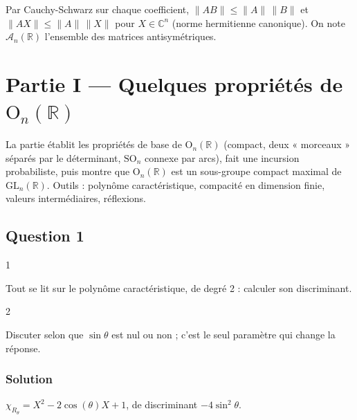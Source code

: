 \documentclass[11pt,a4paper]{article}
\begin{document}
Par Cauchy-Schwarz sur chaque coefficient, \(\|AB\|\le\|A\|\,\|B\|\) et \(\|AX\|\le\|A\|\,\|X\|\) pour \(X\in{\mathbb{C}}^n\) (norme hermitienne canonique). On note \({\mathcal{A}}_n(\mathbb{R})\) l'ensemble des matrices antisymétriques.

\hypertarget{partie-i-quelques-propriuxe9tuxe9s-de-mathrmo_nmathbbr}{%
\section{\texorpdfstring{Partie I --- Quelques propriétés de \({\mathrm{O}}_n(\mathbb{R})\)}{Partie I --- Quelques propriétés de \{\textbackslash mathrm\{O\}\}\_n(\textbackslash mathbb\{R\})}}\label{partie-i-quelques-propriuxe9tuxe9s-de-mathrmo_nmathbbr}}

La partie établit les propriétés de base de \({\mathrm{O}}_n(\mathbb{R})\) (compact, deux « morceaux » séparés par le déterminant, \({\mathrm{SO}}_n\) connexe par arcs), fait une incursion probabiliste, puis montre que \({\mathrm{O}}_n(\mathbb{R})\) est un sous-groupe compact maximal de \({\mathrm{GL}}_n(\mathbb{R})\). Outils : polynôme caractéristique, compacité en dimension finie, valeurs intermédiaires, réflexions.

\hypertarget{question-1}{%
\subsection{Question 1}\label{question-1}}

\begin{indication}{1}

Tout se lit sur le polynôme caractéristique, de degré 2 : calculer son discriminant.

\end{indication}

\begin{indication}{2}

Discuter selon que \(\sin\theta\) est nul ou non ; c'est le seul paramètre qui change la réponse.

\end{indication}

\hypertarget{solution}{%
\subsubsection{Solution}\label{solution}}

\(\chi_{R_\theta}=X^2-2\cos(\theta)X+1\), de discriminant \(-4\sin^2\theta\).
\end{document}
